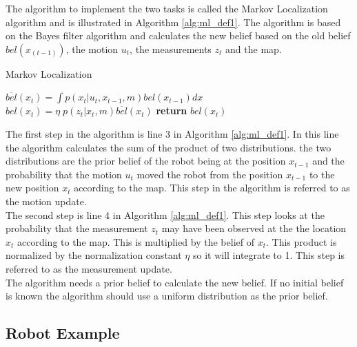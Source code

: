 The algorithm to implement the two tasks is called the Markov Localization algorithm and is illustrated in Algorithm \ref{alg:ml_def1}. The algorithm is based on the Bayes filter algorithm and calculates the new belief based on the old belief $bel(x_{(t-1)})$, the motion $u_t$, the measurements $z_t$ and the map.

\begin{center}
\begin{minipage}{.65\linewidth}
\begin{algorithm}[H]
\caption{Markov Localization}
\label{alg:ml_def1}
\begin{algorithmic}[1]
    \State $\overline{bel}(x_{t}) = \int{p(x_{t}|u_{t},x_{t-1},m)bel(x_{t-1})dx}$
    \State $bel(x_{t}) = \eta\;p(z_{t}|x_{t},m)\overline{bel}(x_{t})$
  \EndFor
  \State \textbf{return} $bel(x_{t})$
\EndProcedure
\end{algorithmic}
\end{algorithm}
\end{minipage}
\end{center}

The first step in the algorithm is line 3 in Algorithm \ref{alg:ml_def1}. In this line the algorithm calculates the sum of the product of two distributions. the two distributions are the prior belief of the robot being at the position $x_{t-1}$ and the probability that the motion $u_t$ moved the robot from the position $x_{t-1}$ to the new position $x_t$ according to the map. This step in the algorithm is referred to as the motion update. \\

The second step is line 4 in Algorithm \ref{alg:ml_def1}. This step looks at the probability that the measurement $z_t$ may have been observed at the the location $x_t$ according to the map. This is multiplied by the belief of $x_t$. This product is normalized by the normalization constant $\eta$ so it will integrate to 1. This step is referred to as the measurement update.\\

The algorithm needs a prior belief to calculate the new belief. If no initial belief is known the algorithm should use a uniform distribution as the prior belief.

\subsection{Robot Example} %
\label{sub:robot_example}


